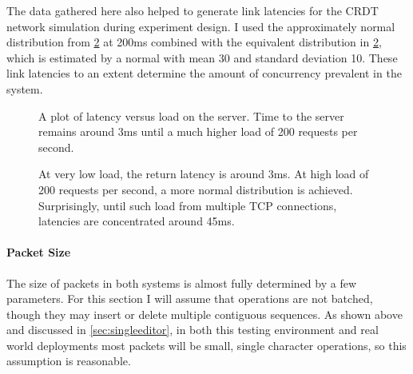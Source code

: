 \documentclass[12pt,a4paper,twoside,openright]{report}
\begin{document}
			The data gathered here also helped to generate link latencies for the CRDT network simulation during experiment design. I used the approximately normal distribution from \ref{fig:latency-sc} at 200ms combined with the equivalent distribution in \ref{fig:latency-sc}, which is estimated by a normal with mean 30 and standard deviation 10. These link latencies to an extent determine the amount of concurrency prevalent in the system.
			
			\begin{figure}[H]
				\centering
					
				\caption[Client-Server Latency] {A plot of latency versus load on the server. Time to the server remains around 3ms until a much higher load of 200 requests per second.}
				\label{fig:latency-cs}
			\end{figure}
			\begin{figure}[H]
				\centering
					
				\caption[Server-Client Latencies] {At very low load, the return latency is around 3ms. At high load of 200 requests per second, a more normal distribution is achieved. Surprisingly, until such load from multiple TCP connections, latencies are concentrated around 45ms.}
				\label{fig:latency-sc}
			\end{figure}
	
		
		\paragraph{Packet Size}
			The size of packets in both systems is almost fully determined by a few parameters. For this section I will assume that operations are not batched, though they may insert or delete multiple contiguous sequences. As shown above and discussed in \cref{sec:singleeditor}, in both this testing environment and real world deployments most packets will be small, single character operations, so this assumption is reasonable.
			
\end{document}
